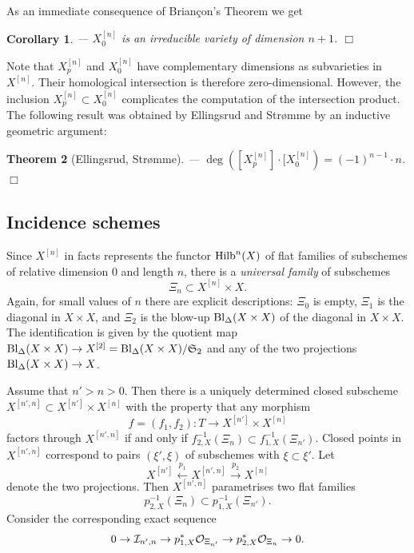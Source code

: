 \documentclass[twoside,11pt]{article}
\newtheorem{theorem}{Theorem}[section]
\newtheorem{corollary}[theorem]{Corollary}
\newcommand{\qed}{\hspace*{\fill}$\Box$\vspace{2ex}}
\newcommand{\beeq}[1]{\begin{eqnarray}\label{#1}}
\newcommand{\eneq}{\end{eqnarray}}
\newcommand{\ki}{{\cal I}}
\newcommand{\ko}{{\cal O}}
\newcommand{\gothS}{{\mathfrak S}}
\newcommand{\Hilb}{{\rm Hilb}}
\newcommand{\blowup}[2]{{\rm Bl}_{#1}{(#2})}
\newcommand{\ses}[3]{0\rightarrow#1\rightarrow#2
   \rightarrow#3\rightarrow0}
\begin{document}
As an immediate consequence of Brian\c{c}on's Theorem we get

\begin{corollary}--- $X^{[n]}_0$ is an irreducible variety of dimension $n+1$.
\qed
\end{corollary}

Note that $X^{[n]}_p$ and $X^{[n]}_0$ have complementary dimensions as 
subvarieties in $X^{[n]}$. Their homological intersection is therefore zero-dimensional. However, the inclusion $X^{[n]}_p\subset X^{[n]}_0$ 
complicates the computation of the intersection product. The following
result was obtained by Ellingsrud and Str\o{}mme \cite{EllStrCoefficient}
by an inductive geometric argument:

\begin{theorem}[Ellingsrud, Str\o{}mme]\label{ESIntersectionnumber}---
$\deg([X^{[n]}_p]\cdot [X^{[n]}_0)=(-1)^{n-1}\cdot n$.\qed
\end{theorem}

 
\subsection{Incidence schemes}\label{subsectionIncidenceSchemes}

Since $X^{[n]}$ in facts represents the functor $\Hilb^n(X)$ of flat families
of subschemes of relative dimension 0 and length $n$, there is a {\em universal
family} of subschemes
$$\Xi_n\subset X^{[n]}\times X.$$
Again, for small values of $n$ there are explicit descriptions: $\Xi_0$ is empty, $\Xi_1$
is the diagonal in $X\times X$, and $\Xi_2$ is the blow-up
$\blowup{\Delta}{X\times X}$ of the diagonal in $X\times X$. The identification 
is given by the quotient map
$\blowup{\Delta}{X\times X}\to X^{[2]}=\blowup{\Delta}{X\times X}/\gothS_2$ 
and any of the two projections $\blowup{\Delta}{X\times X}\to X$.

Assume that $n'>n>0$. Then there is a uniquely determined closed 
subscheme $X^{[n',n]}\subset X^{[n']}\times X^{[n]}$ with the property that
any morphism $$f=(f_1,f_2):T\to X^{[n']}\times X^{[n]}$$
factors through
$X^{[n',n]}$ if and only if $f_{2,X}^{-1}(\Xi_n)\subset f_{1,X}^{-1}(\Xi_{n'})$. Closed points in $X^{[n',n]}$ correspond
to pairs $(\xi',\xi)$ of subschemes with $\xi\subset\xi'$. Let
$$X^{[n']}\stackrel{p_1}{\longleftarrow}X^{[n',n]}
\stackrel{p_2}{\longrightarrow}X^{[n]}$$
denote the two projections. Then $X^{[n',n]}$ parametrises two flat families
$$p_{2,X}^{-1}(\Xi_n)\subset p_{1,X}^{-1}(\Xi_{n'}).$$
Consider the corresponding exact sequence
\beeq{idealsheafInnsequence}
\ses{\ki_{n',n}}{p_{1,X}^*\ko_{\Xi_{n'}}}{p_{2,X}^*\ko_{\Xi_n}}.
\eneq
\end{document}
